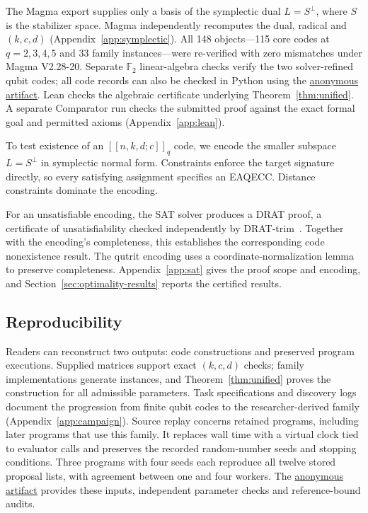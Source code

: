 \documentclass{article}
\newcommand{\F}{\mathbb{F}}
\newcommand{\artifactlink}{\href{https://anonymous.4open.science/r/llm_guided_EAQECC_search-4099}{anonymous artifact}}
\begin{document}
The Magma export supplies only a basis of the symplectic dual
$L=S^\perp$, where $S$ is the stabilizer space. Magma independently
recomputes the dual, radical and $(k,c,d)$ (Appendix~\ref{app:symplectic}).
All 148 objects---115 core codes at $q=2,3,4,5$ and 33 family instances---were re-verified with zero mismatches under Magma V2.28-20.
Separate $\F_2$ linear-algebra checks verify the two solver-refined
qubit codes; all code records can also be checked in Python using the
\artifactlink{}. Lean checks the algebraic certificate underlying
Theorem~\ref{thm:unified}. A separate Comparator run checks the submitted
proof against the exact formal goal and permitted axioms
(Appendix~\ref{app:lean}).


To test existence of an $[[n,k,d;c]]_q$ code, we encode the smaller
subspace $L=S^\perp$ in symplectic normal form. Constraints enforce
the target signature directly, so every satisfying assignment specifies
an EAQECC. Distance constraints dominate the encoding.

For an unsatisfiable encoding, the SAT solver produces a DRAT proof,
a certificate of unsatisfiability checked independently by
DRAT-trim~\citep{DRATtrim}. Together with the encoding's completeness,
this establishes the corresponding code nonexistence result. The qutrit encoding uses a coordinate-normalization
lemma to preserve completeness. Appendix~\ref{app:sat} gives the proof
scope and encoding, and Section~\ref{sec:optimality-results} reports the
certified results.

\subsection{Reproducibility}\label{sec:repro}

Readers can reconstruct two outputs: code constructions and preserved
program executions. Supplied matrices support exact $(k,c,d)$ checks;
family implementations generate instances, and Theorem~\ref{thm:unified}
proves the construction for all admissible parameters. Task specifications
and discovery logs document the progression from finite qubit codes to
the researcher-derived family (Appendix~\ref{app:campaign}). Source replay
concerns retained programs, including later programs that use this family.
It replaces wall time with a virtual clock tied to evaluator calls and
preserves the recorded random-number seeds and stopping conditions.
Three programs with four seeds each reproduce all twelve stored proposal
lists, with agreement between one and four workers. The \artifactlink{}
provides these inputs, independent parameter checks and reference-bound
audits.
\end{document}
